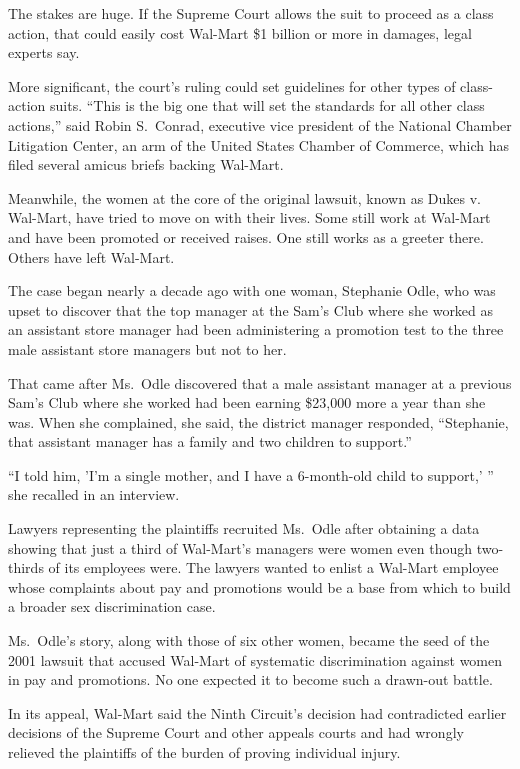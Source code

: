 ﻿\documentclass[12pt]{article}
\begin{document}
The stakes are huge. If the Supreme Court allows the suit to proceed as a class action, that could
easily cost Wal-Mart \$1 billion or more in damages, legal experts say.

More significant, the court's ruling could set guidelines for other types of class-action suits.
``This is the big one that will set the standards for all other class actions,'' said Robin
S.~Conrad, executive vice president of the National Chamber Litigation Center, an arm of the United
States Chamber of Commerce, which has filed several amicus briefs backing Wal-Mart.

Meanwhile, the women at the core of the original lawsuit, known as Dukes v. Wal-Mart, have tried to
move on with their lives. Some still work at Wal-Mart and have been promoted or received raises. One
still works as a greeter there. Others have left Wal-Mart.

The case began nearly a decade ago with one woman, Stephanie Odle, who was upset to discover that
the top manager at the Sam's Club where she worked as an assistant store manager had been
administering a promotion test to the three male assistant store managers but not to her.

That came after Ms.~Odle discovered that a male assistant manager at a previous Sam's Club where she
worked had been earning \$23,000 more a year than she was. When she complained, she said, the
district manager responded, ``Stephanie, that assistant manager has a family and two children to
support.''

``I told him, 'I'm a single mother, and I have a 6-month-old child to support,' '' she recalled in
an interview.

Lawyers representing the plaintiffs recruited Ms.~Odle after obtaining a data showing that just a
third of Wal-Mart's managers were women even though two-thirds of its employees were. The lawyers
wanted to enlist a Wal-Mart employee whose complaints about pay and promotions would be a base from
which to build a broader sex discrimination case.

Ms.~Odle's story, along with those of six other women, became the seed of the 2001 lawsuit that
accused Wal-Mart of systematic discrimination against women in pay and promotions. No one expected
it to become such a drawn-out battle.

In its appeal, Wal-Mart said the Ninth Circuit's decision had contradicted earlier decisions of the
Supreme Court and other appeals courts and had wrongly relieved the plaintiffs of the burden of
proving individual injury.
\end{document}
